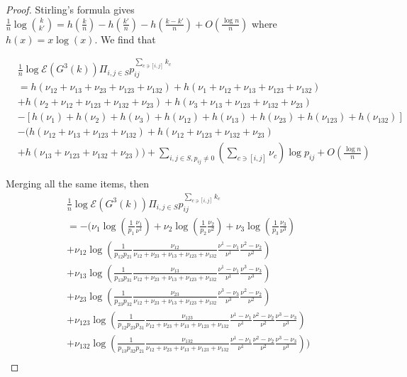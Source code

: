 \documentclass[11pt,en,cite=authoryear]{elegantpaper}
\begin{document}
\begin{proof}
    Stirling's formula gives
    $\frac{1}{n} \log \binom{k}{k'} = h(\frac{k}{n} ) - h(\frac{k'}{n}) - h(\frac{k-k'}{n}) + O(\frac{\log n}{n})$
    where $h(x)=x\log(x)$. We find that

    \begin{align*}
        &\frac{1}{n} \log \mathcal{E} (G^3(k)) \Pi_{i, j \in S} p_{ij}^{\sum_{c \ni [i,j]} k_{c}} \\
        &= h(\nu_{12} + \nu_{13} + \nu_{23}+\nu_{123}+\nu_{132}) 
        + h(\nu_1 + \nu_{12} + \nu_{13} + \nu_{123} +\nu_{132}) \\
        &+ h(\nu_2 + \nu_{12} + \nu_{123} + \nu_{132} +\nu_{23})
        + h(\nu_3 + \nu_{13} +\nu_{123} +\nu_{132} +\nu_{23}) \\
        &- \left[h(\nu_1) + h(\nu_2) + h(\nu_3) + h(\nu_{12}) + h(\nu_{13}) + h(\nu_{23}) + h(\nu_{123}) + h(\nu_{132})\right] \\
        &- \biggl(h(\nu_{12} + \nu_{13} + \nu_{123} +\nu_{132}) + h(\nu_{12} + \nu_{123} + \nu_{132} +\nu_{23}) \\
        & + h(\nu_{13} +\nu_{123} +\nu_{132} +\nu_{23})\biggr)
        +\sum_{i, j \in S, p_{ij}\neq 0} (\sum_{c \ni[i, j]} \nu_{c}) \log p_{ij} + O(\frac{\log n}{n})
    \end{align*}

    Merging all the same items, then
    \begin{align*}
        &\frac{1}{n} \log \mathcal{E} (G^3(k)) \Pi_{i, j \in S} p_{ij}^{\sum_{c \ni [i,j]} k_{c}} \\
        &= -\biggl(
        \nu_1 \log(\frac{1}{p_{1}} \frac{\nu_1}{\nu^1})
        + \nu_2 \log(\frac{1}{p_{2}} \frac{\nu_2}{\nu^2})
        + \nu_3 \log(\frac{1}{p_{3}} \frac{\nu_3}{\nu^3}) \\
        &+\nu_{12} \log(\frac{1}{p_{12}p_{21}} \frac{\nu_{12}}{\nu_{12}+\nu_{23}+\nu_{13}+\nu_{123}+\nu_{132}} 
        \frac{\nu^{1}-\nu_{1}}{\nu^{1}}\frac{\nu^{2}-\nu_{2}}{\nu^{2}}) \\
        &+ \nu_{13} \log(\frac{1}{p_{13}p_{31}} \frac{\nu_{13}}{\nu_{12}+\nu_{23}+\nu_{13}+\nu_{123}+\nu_{132}}
        \frac{\nu^{1}-\nu_{1}}{\nu^{1}}\frac{\nu^{3}-\nu_{3}}{\nu^{3}}) \\
        &+ \nu_{23} \log(\frac{1}{p_{23}p_{32}} \frac{\nu_{23}}{\nu_{12}+\nu_{23}+\nu_{13}+\nu_{123}+\nu_{132}} 
        \frac{\nu^{3}-\nu_{3}}{\nu^{3}}\frac{\nu^{2}-\nu_{2}}{\nu^{2}}) \\
        &+ \nu_{123} \log(\frac{1}{p_{12}p_{23}p_{31}} \frac{\nu_{123}}{\nu_{12}+\nu_{23}+\nu_{13}+\nu_{123}+\nu_{132}}
        \frac{\nu^{1}-\nu_{1}}{\nu^{1}}\frac{\nu^{2}-\nu_{2}}{\nu^{2}} \frac{\nu^{3}-\nu_{3}}{\nu^{3}}) \\
        &+ \nu_{132} \log(\frac{1}{p_{13}p_{32}p_{21}} \frac{\nu_{132}}{\nu_{12}+\nu_{23}+\nu_{13}+\nu_{123}+\nu_{132}}
        \frac{\nu^{1}-\nu_{1}}{\nu^{1}}\frac{\nu^{2}-\nu_{2}}{\nu^{2}} \frac{\nu^{3}-\nu_{3}}{\nu^{3}}) \biggr)\\
    \end{align*}


\end{proof}
\end{document}
